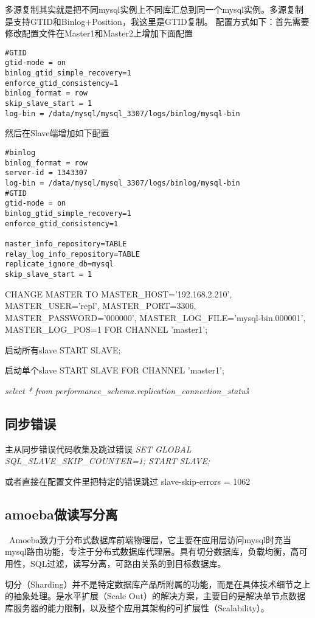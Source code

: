 多源复制其实就是把不同mysql实例上不同库汇总到同一个mysql实例。多源复制是支持GTID和Binlog+Position，我这里是GTID复制。
配置方式如下：首先需要修改配置文件在Master1和Master2上增加下面配置
 \begin{lstlisting}
#GTID
gtid-mode = on
binlog_gtid_simple_recovery=1
enforce_gtid_consistency=1
binlog_format = row
skip_slave_start = 1
log-bin = /data/mysql/mysql_3307/logs/binlog/mysql-bin
  \end{lstlisting}
然后在Slave端增加如下配置
 \begin{lstlisting}
#binlog
binlog_format = row
server-id = 1343307
log-bin = /data/mysql/mysql_3307/logs/binlog/mysql-bin
#GTID
gtid-mode = on
binlog_gtid_simple_recovery=1
enforce_gtid_consistency=1

master_info_repository=TABLE
relay_log_info_repository=TABLE
replicate_ignore_db=mysql
skip_slave_start = 1
 \end{lstlisting}
 
CHANGE MASTER TO MASTER_HOST='192.168.2.210',
MASTER_USER='repl',
MASTER_PORT=3306,
MASTER_PASSWORD='000000',
MASTER_LOG_FILE='mysql-bin.000001',
MASTER_LOG_POS=1 FOR CHANNEL 'master1';

启动所有slave
START SLAVE;

启动单个slave
START SLAVE FOR CHANNEL 'master1';

\textit{select * from performance_schema.replication_connection_status\G}

\subsection{同步错误}
主从同步错误代码收集及跳过错误
\textit{SET GLOBAL SQL_SLAVE_SKIP_COUNTER=1; START SLAVE; }

或者直接在配置文件里把特定的错误跳过 slave-skip-errors = 1062

\subsection{amoeba做读写分离}

 Amoeba致力于分布式数据库前端物理层，它主要在应用层访问mysql时充当mysql路由功能，专注于分布式数据库代理层。具有切分数据库，负载均衡，高可用性，SQL过滤，读写分离，可路由关系的到目标数据库。

切分（Sharding）并不是特定数据库产品所附属的功能，而是在具体技术细节之上的抽象处理。是水平扩展（Scale Out）的解决方案，主要目的是解决单节点数据库服务器的能力限制，以及整个应用其架构的可扩展性（Scalability）。

